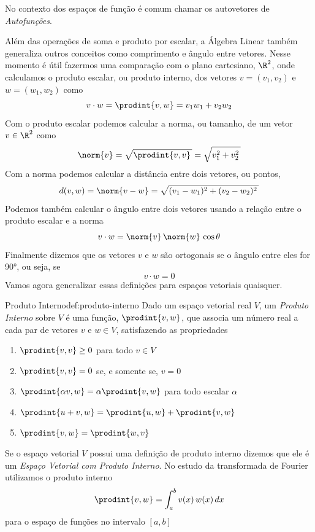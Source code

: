 No contexto dos espaços de função é comum chamar os autovetores de
\emph{Autofunções}.

Além das operações de soma e produto por escalar, a Álgebra Linear
também generaliza outros conceitos como comprimento e ângulo entre
vetores.
Nesse momento é útil fazermos uma comparação com o plano cartesiano, $\R^2$,
onde calculamos o produto escalar, ou produto interno,
dos vetores $v=(v_1, v_2)$ e $w=(w_1, w_2)$ como
\[
  v\cdot w = \prodint{v, w} = v_1 w_1 + v_2 w_2
\]
Com o produto escalar podemos calcular a norma, ou tamanho, de um vetor $v\in\R^2$
como
\[
  \norm{v} = \sqrt{\prodint{v, v}\,} = \sqrt{ v_1^2 + v_2^2\,}
\]
Com a norma podemos calcular a distância entre dois vetores, ou pontos,
\[
  d(v, w) = \norm{v-w} = \sqrt{ (v_1-w_1)^2 + (v_2-w_2)^2\,}
\]
Podemos também calcular o ângulo entre dois vetores usando a relação entre
o produto escalar e a norma
\[
  v\cdot w = \norm{v}\, \norm{w}\, \cos\theta
\]
Finalmente dizemos que os vetores $v$ e $w$ são ortogonais se o ângulo entre
eles for \ang{90}, ou seja, se
\[
  v\cdot w = 0
\]
Vamos agora generalizar essas definições para espaços vetoriais quaisquer.

\begin{definicao}{Produto Interno}{def:produto-interno}
  Dado um espaço vetorial real $V$, um \emph{Produto Interno}
  sobre $V$ é uma função, \(\prodint{v, w}\),
  que associa um número real a cada par de vetores $v$ e $w\in V$,
  satisfazendo as propriedades
  \begin{enumerate}
    \item \(\prodint{v, v} \geq 0\) para todo $v\in V$
    \item \(\prodint{v, v} = 0\) se, e somente se, $v=0$
    \item \(\prodint{\alpha v, w} = \alpha \prodint{v, w}\) para todo escalar $\alpha$
    \item \(\prodint{u+v, w} = \prodint{u, w} + \prodint{v, w}\)
    \item \(\prodint{v, w} = \prodint{w, v}\)
  \end{enumerate}
\end{definicao}

Se o espaço vetorial $V$ possui uma definição de produto interno dizemos que ele é um
\emph{Espaço Vetorial com Produto Interno}.
No estudo da transformada de Fourier utilizamos o produto interno
\begin{equation}
  \label{eq:produto_interno_funcoes}
  \prodint{v, w} = \int_a^b v(x) \, w(x) \, dx
\end{equation}
para o espaço de funções no intervalo $[a, b]$

